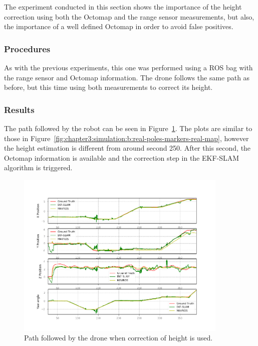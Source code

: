 The experiment conducted in this section shows the importance of the height correction using both the Octomap and the range sensor measurements, but also, the importance of a well defined Octomap in order to avoid false positives.

\subsubsection{Procedures}
\label{subsubsec:chapter3:simulation:c:procedures}
As with the previous experiments, this one was performed using a \ac{ROS} bag with the range sensor and Octomap information. The drone follows the same path as before, but this time using both measurements to correct its height. %

\subsubsection{Results}
\label{subsubsec:chapter3:simulation:c:results}
The path followed by the robot can be seen in Figure~\ref{fig:chapter3:simulation:c:path-w-range}. The plots are similar to those in Figure~\ref{fig:chapter3:simulation:b:real-poles-markers-real-map}, however the height estimation is different from around second 250. After this second, the Octomap information is available and the correction step in the EKF-SLAM algorithm is triggered.\\
\begin{figure}
    \centering
    \includegraphics[width=0.9\textwidth]{Images/fig23-path-w-laser.png}
    \caption{Path followed by the drone when correction of height is used.}
    \label{fig:chapter3:simulation:c:path-w-range}
\end{figure}

